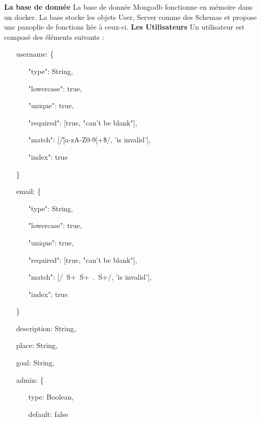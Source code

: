 \documentclass{article}
\begin{document}
\textbf{La base de donnée}
\newline
\newline
La base de donnée Mongodb fonctionne en mémoire dans un docker. La base stocke les objets User, Server comme des Schemas et propose une panoplie de fonctions liée à ceux-ci.
\newline
\newline
\textbf{Les Utilisateurs}
\newline
\newline
Un utilisateur est composé des éléments suivants :
\begin{itemize}
	\item[username: \{]
	\begin{itemize}
		\item[]
		\item[]"type": String,
		\item[]"lowercase": true,
		\item[]"unique": true,
		\item[]"required": [true, "can't be blank"],
		\item[]"match": [/\^ [a-zA-Z0-9]+\$/, 'is invalid'],
		\item[]"index": true
	\end{itemize}
	\item[\}]
	\item[email: \{]
	\begin{itemize}
		\item[]
		\item[]"type": String,
		\item[]"lowercase": true,
		\item[]"unique": true,
		\item[]"required": [true, "can't be blank"],
		\item[]"match": [/\ S+\@\ S+\ .\ S+/, 'is invalid'],
		\item[]"index": true
	\end{itemize}
	\item[\}]
	\item[]description: String,
	\item[]place: String,
	\item[]goal: String,
	\item[admin: \{]
	\begin{itemize}
		\item[]
		\item[]type: Boolean,
		\item[]default: false
	\end{itemize}

\end{itemize}
\end{document}
